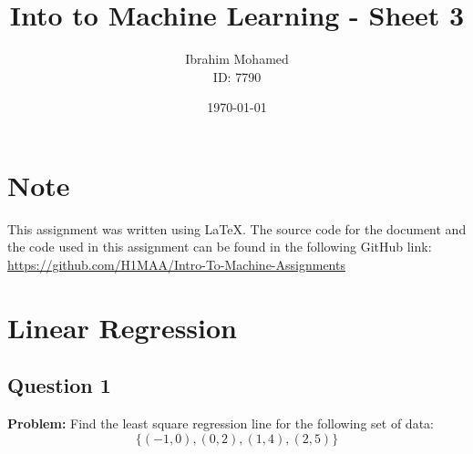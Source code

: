 \documentclass[a4paper,12pt]{article}
\title{Into to Machine Learning - Sheet 3}
\author{Ibrahim Mohamed \\ ID: 7790}
\date{\today}
\begin{document}
\maketitle
\section*{Note}
This assignment was written using LaTeX. The source code for the document and the code used in this assignment can be found in the following GitHub link:
\url{https://github.com/H1MAA/Intro-To-Machine-Assignments}

\thispagestyle{empty}
\newpage

\section{Linear Regression}
\subsection{Question 1}
\textbf{Problem:} Find the least square regression line for the following set of data:
\[
\{(-1,0), (0,2), (1,4), (2,5)\}
\]
\end{document}
